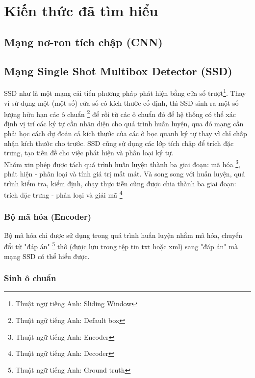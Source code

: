 \documentclass[a4paper,12pt]{article}
\begin{document}
	
	
	
	\newpage
	\section{Kiến thức đã tìm hiểu}
	\subsection{Mạng nơ-ron tích chập (CNN)}
	
	\subsection{Mạng Single Shot Multibox Detector (SSD)}
	
	SSD như là một mạng cải tiến phương pháp phát hiện bằng cửa sổ trượt\footnote{Thuật ngữ tiếng Anh: Sliding Window}. Thay vì sử dụng một (một số) cửa sổ có kích thước cố định, thì SSD sinh ra một số lượng hữu hạn các ô chuẩn \footnote{Thuật ngữ tiếng Anh: Default box} để rồi từ các ô chuẩn đó để hệ thống có thể xác định vị trí các ký tự cần nhận diện cho quá trình huấn luyện, qua đó mạng cần phải học cách dự đoán cả kích thước của các ô bọc quanh ký tự thay vì chỉ chấp nhận kích thước cho trước. SSD cũng sử dụng các lớp tích chập để trích đặc trưng, tạo tiền đề cho việc phát hiện và phân loại ký tự. \\
	
	Nhóm xin phép được tách quá trình huấn luyện thành ba giai đoạn: mã hóa \footnote{Thuật ngữ tiếng Anh: Encoder}, phát hiện - phân loại và tính giá trị mất mát. Và song song với huấn luyện, quá trình kiểm tra, kiểm định, chạy thực tiễn cũng được chia thành ba giai đoạn: trích đặc trưng - phân loại và giải mã \footnote{Thuật ngữ tiếng Anh: Decoder}
	
	\subsubsection{Bộ mã hóa (Encoder)}
	Bộ mã hóa chỉ được sử dụng trong quá trình huấn luyện nhằm mã hóa, chuyển đổi từ "đáp án" \footnote{Thuật ngữ tiếng Anh: Ground truth} thô (được lưu trong tệp tin txt hoặc xml) sang "đáp án" mà mạng SSD có thể hiểu được.
	
	\subsubsection*{Sinh ô chuẩn}
	
\end{document}
